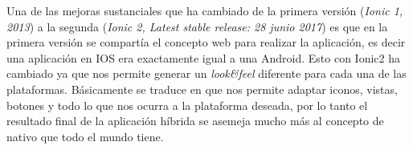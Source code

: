 

Una de las mejoras sustanciales que ha cambiado de la primera versión (\emph{Ionic 1, 2013}) a la segunda (\emph{Ionic 2, Latest stable release: 28 junio 2017}) es que en la primera versión se compartía el concepto web para realizar la aplicación, es decir una aplicación en IOS era exactamente igual a una Android. Esto con Ionic2 ha cambiado ya que nos permite generar un \emph{look\&feel} diferente para cada una de las plataformas. Básicamente se traduce en que nos permite adaptar iconos, vistas, botones y todo lo que nos ocurra a la plataforma deseada, por lo tanto el resultado final de la aplicación híbrida se asemeja mucho más al concepto de nativo que todo el mundo tiene.





